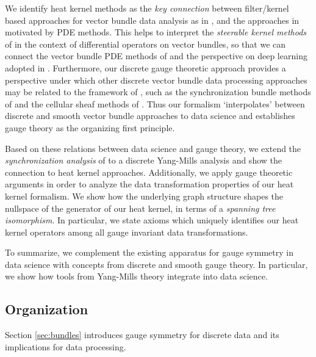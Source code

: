 \documentclass[10pt,reqno]{amsart}
\numberwithin{equation}{section}
\theoremstyle{bfnote}
\theoremstyle{bfdef}
\begin{document}
	We identify heat kernel methods as the \textit{key connection} between filter/kernel based approaches for vector bundle data analysis as in \cite{gerkenGeometricDeepLearning2021}, \cite{weilerCoordinateIndependentConvolutional2021} and the approaches in \cite{batardHeatEquationsVector2011,batardClassGeneralizedLaplacians2014} motivated by PDE methods.
	This helps to interpret the \textit{steerable kernel methods} of \cite{weilerCoordinateIndependentConvolutional2021,jennerSteerablePartialDifferential2022} in the context of differential operators on vector bundles, so that we can connect the vector bundle PDE methods of \cite{batardClassGeneralizedLaplacians2014} and the perspective on deep learning adopted in \cite{weilerCoordinateIndependentConvolutional2021}.
	Furthermore, our discrete gauge theoretic approach provides a perspective under which other discrete vector bundle data processing approaches may be related to the framework of \cite{weilerCoordinateIndependentConvolutional2021}, such as the synchronization bundle methods of \cite{gaoGeometrySynchronizationProblems2019} and the cellular sheaf methods of \cite{hansenOpinionDynamicsDiscourse2021,bodnarNeuralSheafDiffusion2023,bambergerBundleNeuralNetworks2024}.
	Thus our formalism `interpolates' between discrete and smooth vector bundle approaches to data science and establishes gauge theory as the organizing first principle.

	Based on these relations between data science and gauge theory, we extend the \textit{synchronization analysis} of \cite{gaoGeometrySynchronizationProblems2019} to a discrete Yang-Mills analysis and show the connection to heat kernel approaches.
	Additionally, we apply gauge theoretic arguments in order to analyze the data transformation properties of our heat kernel formalism. We show how the underlying graph structure shapes the nullspace of the generator of our heat kernel, in terms of a \textit{spanning tree isomorphism}. In particular, we state axioms which uniquely identifies our heat kernel operators among all gauge invariant data transformations.

	To summarize, we complement the existing apparatus for gauge symmetry in data science with concepts from discrete and smooth gauge theory. In particular, we show how tools from Yang-Mills theory integrate into data science.

\subsection{Organization}
	Section \ref{sec:bundles} introduces gauge symmetry for discrete data and its implications for data processing.
\end{document}
